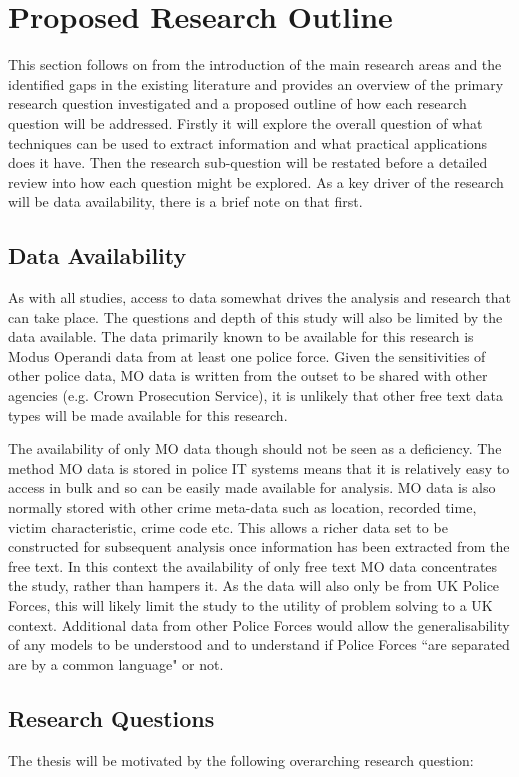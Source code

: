 \chapter{ Proposed Research Outline} This section follows on from the introduction of the main research areas and the identified gaps in the existing literature and provides an overview of the primary research question investigated and a proposed outline of how each research question will be addressed. Firstly it will explore the overall question of what techniques can be used to extract information and  what practical applications does it have. Then the research sub-question will be restated before a detailed review into how each question might be explored.  As a key driver of the research will be data availability, there is a brief note on that first.

\section{Data Availability} As with all studies, access to data somewhat drives the analysis and research that can take place. The questions and depth of this study will also be limited by the data available. The data primarily known to be available for this research is Modus Operandi data from at least one police force. Given the sensitivities of other police data, MO data is written from the outset to be shared with other agencies (e.g. Crown Prosecution Service), it is unlikely that other free text data types will be made available for this research. 

The availability of only MO data though should not be seen as a deficiency. The method MO data is stored in police IT systems means that it is relatively easy to access in bulk and so can be easily made available for analysis. MO data is also normally stored with other crime meta-data such as location, recorded time, victim characteristic, crime code etc. This allows a richer data set to be constructed for subsequent analysis once information has been extracted from the free text. In this context the availability of only free text MO data concentrates the study, rather than hampers it. As the data will also only be from UK Police Forces, this will likely limit the study to the utility of problem solving to a UK context. Additional data from other Police Forces would allow the generalisability of any models to be understood and to understand if Police Forces ``are separated are by a common language" or not.

\section{Research Questions}
The thesis will be motivated by the following overarching research question: 

